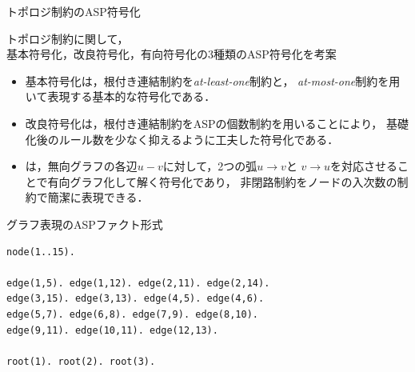 \documentclass[dvipdfmx,11pt]{beamer}
\begin{document}
\begin{frame}{トポロジ制約のASP符号化}
  \renewcommand{\thefootnote}{\fnsymbol{footnote}}
  \setcounter{footnote}{1}
\begin{block}{}
 \centering
 トポロジ制約に関して，\\
 基本符号化，改良符号化，有向符号化の3種類のASP符号化を考案
\end{block}
 \vfill
 \begin{itemize}
  \item 基本符号化は，根付き連結制約を\textit{at-least-one}制約と，
        \textit{at-most-one}制約を用いて表現する基本的な符号化である．
  \item 改良符号化は，根付き連結制約をASPの個数制約を用いることにより，
        基礎化後のルール数を少なく抑えるように工夫した符号化である．
  \item {}は，無向グラフの各辺$u-v$に対して，2つの弧$u\rightarrow v$と
        $v\rightarrow u$を対応させることで有向グラフ化して解く符号化であり，
        非閉路制約をノードの入次数の制約で簡潔に表現できる．
 \end{itemize}
\end{frame}
\begin{frame}[fragile]{グラフ表現のASPファクト形式}
\begin{figure}[t]
 \centering
 \scalebox{0.45}{}
\end{figure}
\begin{exampleblock}{}
\begin{lstlisting}
node(1..15).

edge(1,5). edge(1,12). edge(2,11). edge(2,14). 
edge(3,15). edge(3,13). edge(4,5). edge(4,6). 
edge(5,7). edge(6,8). edge(7,9). edge(8,10).
edge(9,11). edge(10,11). edge(12,13).

root(1). root(2). root(3).
\end{lstlisting}
\end{exampleblock}
\end{frame}
\end{document}
